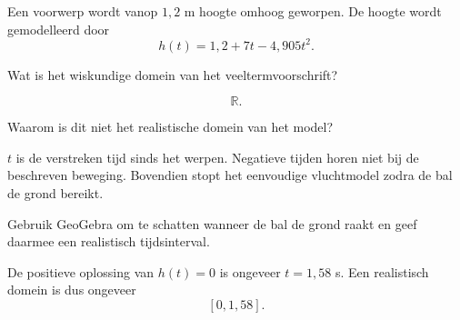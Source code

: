 \documentclass{ximera}
\begin{document}
\begin{oefening}{\oefB\ESS}

Een voorwerp wordt vanop \(1{,}2\) m hoogte omhoog geworpen. De hoogte wordt
gemodelleerd door
\[
h(t)=1{,}2+7t-4{,}905t^2.
\]

\begin{question}
Wat is het wiskundige domein van het veeltermvoorschrift?

\begin{oplossing}
\[
\mathbb{R}.
\]
\end{oplossing}
\end{question}

\begin{question}
Waarom is dit niet het realistische domein van het model?

\begin{oplossing}
\(t\) is de verstreken tijd sinds het werpen. Negatieve tijden horen niet bij
de beschreven beweging. Bovendien stopt het eenvoudige vluchtmodel zodra
de bal de grond bereikt.
\end{oplossing}
\end{question}

\begin{question}
Gebruik GeoGebra om te schatten wanneer de bal de grond raakt en geef daarmee
een realistisch tijdsinterval.

\begin{oplossing}
De positieve oplossing van \(h(t)=0\) is ongeveer \(t=1{,}58\) s.
Een realistisch domein is dus ongeveer
\[
[0,1{,}58].
\]
\end{oplossing}
\end{question}

\end{oefening}
\end{document}
